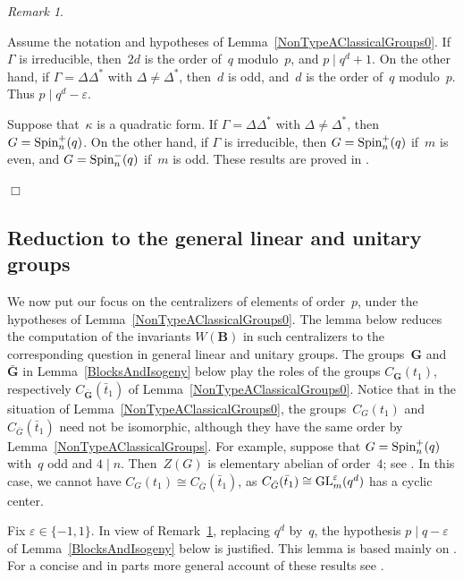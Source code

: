 \documentclass[12pt]{amsart}
\newcommand{\bG}{{\mathbf{G}}}      %
\newcommand{\bB}{{\mathbf{B}}}
\def\GL{ \text{\rm GL} }
\def\Spin{ \text{\rm Spin} }
\theoremstyle{theorem}
\theoremstyle{definition}
\theoremstyle{remark}
\newtheorem{rem}[thm]{Remark}
\begin{document}
\begin{rem}
\label{RemNonTypeAClassicalGroups0}
{\rm
Assume the notation and hypotheses of Lemma~\ref{NonTypeAClassicalGroups0}.
If $\Gamma$ is irreducible, then~$2d$ is the order 
of~$q$ modulo~$p$, and $p \mid q^d + 1$. On the other hand, if $\Gamma = 
\Delta\Delta^*$ with $\Delta \neq \Delta^*$, then~$d$ is odd, and~$d$ is the 
order of~$q$ modulo~$p$. Thus $p \mid q^d - \varepsilon$.

Suppose that~$\kappa$ is a quadratic form. If $\Gamma = \Delta\Delta^*$ with
$\Delta \neq \Delta^*$, then $G = \Spin^+_n( q )$. On the other hand, if
$\Gamma$ is irreducible, then $G = \Spin^+_n( q )$ if~$m$ is even, and
$G = \Spin^-_n( q )$ if~$m$ is odd. These results are proved in
\cite[Lemmas $4.1$, $4.5$]{HM19}.
}\hfill{$\Box$}
\end{rem}

\subsection{Reduction to the general linear and unitary groups}
We now put our focus on the centralizers of elements of order~$p$, under the 
hypotheses of Lemma~\ref{NonTypeAClassicalGroups0}. The lemma below reduces 
the computation of the invariants $W( \bB )$ in such centralizers to the 
corresponding question in general linear and unitary groups. The groups~$\bG$
and $\bar{\bG}$ in Lemma~\ref{BlocksAndIsogeny} below play the roles of the 
groups $C_{\bG}( t_1 )$, respectively $C_{\bar{\bG}}( \bar{t}_1 )$ of 
Lemma~\ref{NonTypeAClassicalGroups0}. Notice that in the situation of 
Lemma~\ref{NonTypeAClassicalGroups0}, the groups~$C_{G}( t_1 )$ 
and~$C_{\bar{G}}( \bar{t}_1 )$ need not be isomorphic, although they have the 
same order by Lemma~\ref{NonTypeAClassicalGroups}. For example, suppose that 
$G = \Spin_n^+( q )$ with~$q$ odd and $4 \mid n$. Then~$Z( G )$ is
elementary abelian of order~$4$; see \cite[Table~$6.1.2$]{Gor}. In this case,
we cannot have $C_G( t_1 ) \cong C_{\bar{G}}( \bar{t}_1 )$, as 
$C_{\bar{G}}( \bar{t}_1 ) \cong \GL^\varepsilon_m( q^d )$ has a cyclic center.

Fix $\varepsilon \in \{ -1, 1 \}$. In view of 
Remark~\ref{RemNonTypeAClassicalGroups0}, replacing $q^d$ by~$q$, the hypothesis 
$p \mid q - \varepsilon$ of Lemma~\ref{BlocksAndIsogeny} below is justified.
This lemma is based mainly on \cite{CaEn99}. For a concise and in parts more
general account of these results see \cite[Sections~$2$,~$3$]{KeMa}.
\end{document}
